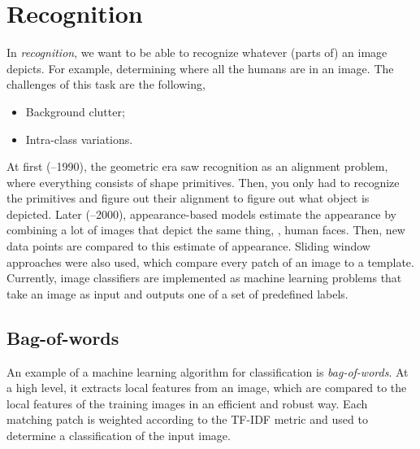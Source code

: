 \section{Recognition} \label{sec:recognition}

In \textit{recognition}, we want to be able to recognize whatever (parts of) an
image depicts. For example, determining where all the humans are in an image. The
challenges of this task are the following,
\begin{itemize}
  \item Background clutter;
  \item Intra-class variations.
\end{itemize}

At first (--1990), the geometric era saw recognition as an
alignment problem, where everything consists of shape primitives. Then, you
only had to recognize the primitives and figure out their alignment to figure
out what object is depicted. Later (--2000), appearance-based
models estimate the appearance by combining a lot of images that depict the
same thing, \eg, human faces. Then, new data points are compared to this
estimate of appearance. Sliding window approaches were also used, which compare
every patch of an image to a template. Currently, image classifiers are
implemented as machine learning problems that take an image as input and
outputs one of a set of predefined labels.

\subsection{Bag-of-words}

An example of a machine learning algorithm for classification is
\textit{bag-of-words}. At a high level, it extracts local features from an
image, which are compared to the local features of the training images in an
efficient and robust way. Each matching patch is weighted according to the
TF-IDF metric and used to determine a classification of the input image.


